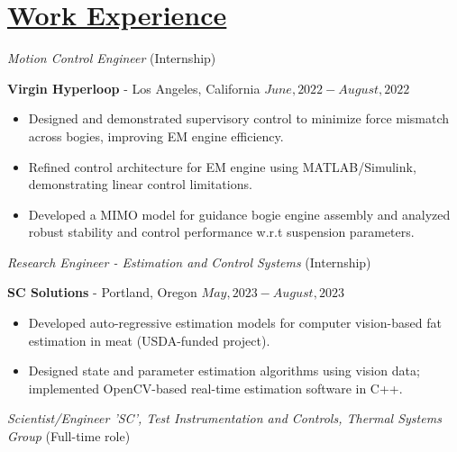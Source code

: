 \section*{\underline{Work Experience}}
\noindent \textit{Motion Control Engineer } (Internship)

\textbf{Virgin Hyperloop} - Los Angeles, California \hfill $June, 2022  - August, 2022$

\begin{itemize}
        \item Designed and demonstrated supervisory control to minimize force mismatch across bogies, improving EM engine efficiency.
        \item Refined control architecture for EM engine using MATLAB/Simulink, demonstrating linear control limitations.
        \item Developed a MIMO model for guidance bogie engine assembly and analyzed robust stability and control performance w.r.t suspension parameters.
\end{itemize}

\medskip

\noindent\textit{Research Engineer  - Estimation and Control Systems} (Internship)

\textbf{SC Solutions} - Portland, Oregon \hfill $May, 2023 - August, 2023$

\begin{itemize}
    \item Developed auto-regressive estimation models for computer vision-based fat estimation in meat (USDA-funded project).
    \item Designed state and parameter estimation algorithms using vision data; implemented OpenCV-based real-time estimation software in C++.
\end{itemize}

\medskip

\noindent\textit{Scientist/Engineer 'SC', Test Instrumentation and Controls, Thermal Systems Group} (Full-time role)

